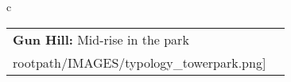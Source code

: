 \begin{table}[H]
        \begin{tabular}{c}
        \begin{tabular}{m{1.5in} m{2in}}
\textbf{Gun Hill:} {Mid-rise in the park} & \texttt{[image: \\rootpath/IMAGES/typology\_towerpark.png]}
\end{tabular}\end{tabular}
        \end{table}